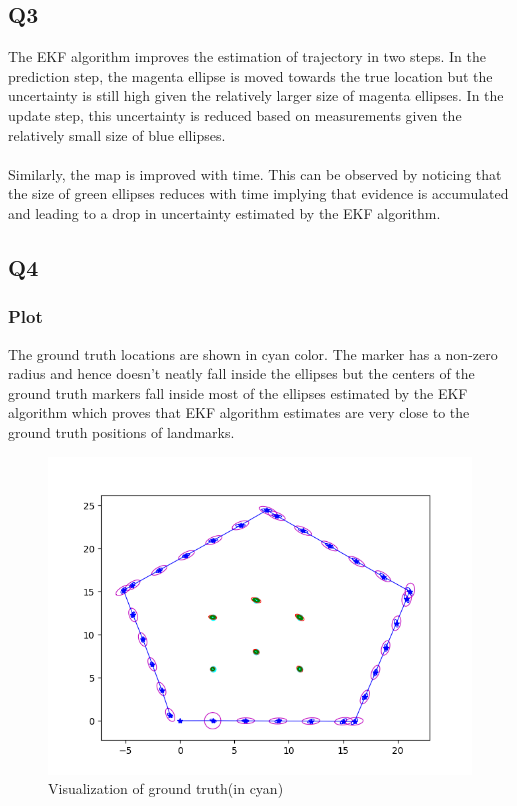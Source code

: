 \documentclass[12pt, a4paper]{article}
\begin{document}
\subsection{Q3}
The EKF algorithm improves the estimation of trajectory in two steps. In the prediction step, the magenta ellipse is moved towards the true location but the uncertainty is still high given the relatively larger size of magenta ellipses. In the update step, this uncertainty is reduced based on measurements given the relatively small size of blue ellipses.\\\\
Similarly, the map is improved with time. This can be observed by noticing that the size of green ellipses reduces with time implying that evidence is accumulated and leading to a drop in uncertainty estimated by the EKF algorithm.
\subsection{Q4}
\subsubsection{Plot}
The ground truth locations are shown in cyan color. The marker has a non-zero radius and hence doesn't neatly fall inside the ellipses but the centers of the ground truth markers fall inside most of the ellipses estimated by the EKF algorithm which proves that EKF algorithm estimates are very close to the ground truth positions of landmarks.
\begin{figure}[H]
  \centering
  \includegraphics[width=1\textwidth]{./results/q2_4/result.png}
  \caption{Visualization of ground truth(in cyan)}
\end{figure}
\end{document}
